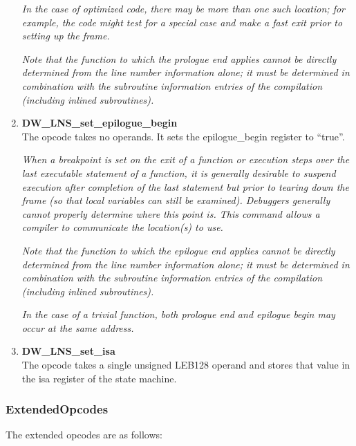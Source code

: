 \begin{enumerate}[1.]
\textit{In the case of optimized code, there may be more than one such
location; for example, the code might test for a special case
and make a fast exit prior to setting up the frame.}

\textit{Note that the function to which the prologue end applies cannot
be directly determined from the line number information alone;
it must be determined in combination with the subroutine
information entries of the compilation (including inlined
subroutines).}


\item \textbf{DW\-\_LNS\-\_set\-\_epilogue\-\_begin} \\
The  opcode takes no operands. It
sets the epilogue\_begin register to ``true''.

\textit{When a breakpoint is set on the exit of a function or execution
steps over the last executable statement of a function, it is
generally desirable to suspend execution after completion of
the last statement but prior to tearing down the frame (so that
local variables can still be examined). Debuggers generally
cannot properly determine where this point is. This command
allows a compiler to communicate the location(s) to use.}

\textit{Note that the function to which the epilogue end applies cannot
be directly determined from the line number information alone;
it must be determined in combination with the subroutine
information entries of the compilation (including inlined
subroutines).}

\textit{In the case of a trivial function, both prologue end and
epilogue begin may occur at the same address.}

\item \textbf{DW\-\_LNS\-\_set\-\_isa} \\
The  opcode takes a single
unsigned LEB128 operand and stores that value in the isa
register of the state machine.
\end{enumerate}

\subsubsection{ExtendedOpcodes}
\label{chap:extendedopcodes}

The extended opcodes are as follows:

